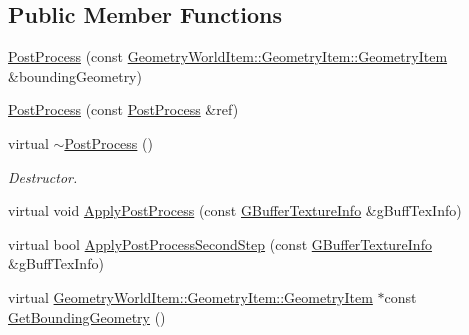 \subsection*{Public Member Functions}
\begin{DoxyCompactItemize}
\item 
\mbox{\hyperlink{class_geometry_engine_1_1_geometry_post_process_1_1_post_process_a3df1b89c25bd790e3ded93e088aca222}{Post\+Process}} (const \mbox{\hyperlink{class_geometry_engine_1_1_geometry_world_item_1_1_geometry_item_1_1_geometry_item}{Geometry\+World\+Item\+::\+Geometry\+Item\+::\+Geometry\+Item}} \&bounding\+Geometry)
\item 
\mbox{\hyperlink{class_geometry_engine_1_1_geometry_post_process_1_1_post_process_af5599c4257746130644eb6beb421a25a}{Post\+Process}} (const \mbox{\hyperlink{class_geometry_engine_1_1_geometry_post_process_1_1_post_process}{Post\+Process}} \&ref)
\item 
\mbox{\label{class_geometry_engine_1_1_geometry_post_process_1_1_post_process_ae50dbe0c834a713d1f3163f9706b2e91}} 
virtual \mbox{\hyperlink{class_geometry_engine_1_1_geometry_post_process_1_1_post_process_ae50dbe0c834a713d1f3163f9706b2e91}{$\sim$\+Post\+Process}} ()
\begin{DoxyCompactList}\small\item\em Destructor. \end{DoxyCompactList}\item 
virtual void \mbox{\hyperlink{class_geometry_engine_1_1_geometry_post_process_1_1_post_process_a2dbb157265ebdeea658982673e757d46}{Apply\+Post\+Process}} (const \mbox{\hyperlink{class_geometry_engine_1_1_g_buffer_texture_info}{G\+Buffer\+Texture\+Info}} \&g\+Buff\+Tex\+Info)
\item 
virtual bool \mbox{\hyperlink{class_geometry_engine_1_1_geometry_post_process_1_1_post_process_a3657f263948ecee70314c859e15412e1}{Apply\+Post\+Process\+Second\+Step}} (const \mbox{\hyperlink{class_geometry_engine_1_1_g_buffer_texture_info}{G\+Buffer\+Texture\+Info}} \&g\+Buff\+Tex\+Info)
\item 
\mbox{\label{class_geometry_engine_1_1_geometry_post_process_1_1_post_process_ac6330351811b87a8e701402e2d04d415}} 
virtual \mbox{\hyperlink{class_geometry_engine_1_1_geometry_world_item_1_1_geometry_item_1_1_geometry_item}{Geometry\+World\+Item\+::\+Geometry\+Item\+::\+Geometry\+Item}} $\ast$const \mbox{\hyperlink{class_geometry_engine_1_1_geometry_post_process_1_1_post_process_ac6330351811b87a8e701402e2d04d415}{Get\+Bounding\+Geometry}} ()

\end{DoxyCompactItemize}
